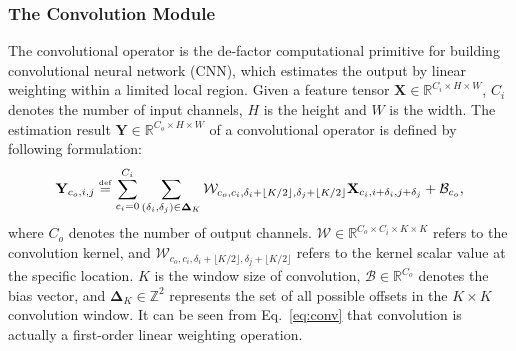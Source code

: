 \documentclass{article}
\begin{document}
\subsubsection{The Convolution Module}
The convolutional operator is the de-factor computational primitive for building convolutional neural network (CNN), which estimates the output by linear weighting within a limited local region.
Given a feature tensor {\small$\mathbf{X}\in\mathbb{R}^{C_{i}\times H\times W}$}, {\small$C_{i}$} denotes the number of input channels, $H$ is the height and $W$ is the width.
The estimation result {\small$\mathbf{Y}\in\mathbb{R}^{C_{o}\times H\times W}$} of a convolutional operator is defined by following formulation:
\begin{equation}
\centering
\mathbf{Y}_{c_o,i,j} \overset{\underset{\mathrm{def}}{}}{=} \sum_{c_i=0}^{C_i}\sum_{(\delta_i,\delta_j)\in \mathbf{\Delta}_K} \mathcal{W}_{c_o,c_i,\delta_i+\lfloor K/2 \rfloor, \delta_j + \lfloor K/2 \rfloor} \mathbf{X}_{c_i,i+\delta_i,j+\delta_j} + \mathcal{B}_{c_o},
\label{eq:conv}
\end{equation}
where {\small$C_{o}$} denotes the number of output channels.
{\small$\mathcal{W}\in\mathbb{R}^{C_{o}\times C_{i}\times K\times K}$} refers to the convolution kernel, and {\small$\mathcal{W}_{c_o,c_i,\delta_i+\lfloor K/2 \rfloor, \delta_j + \lfloor K/2 \rfloor}$} refers to the kernel scalar value at the specific location. $K$ is the window size of convolution, {\small$\mathcal{B}\in \mathbb{R}^{C_{o}}$} denotes the bias vector, and {\small$\mathbf{\Delta}_K\in \mathbb{Z}^2$} represents the set of all possible offsets in the {\small$K \times K$} convolution window.
It can be seen from Eq.~\ref{eq:conv} that convolution is actually a first-order linear weighting operation.
\end{document}
